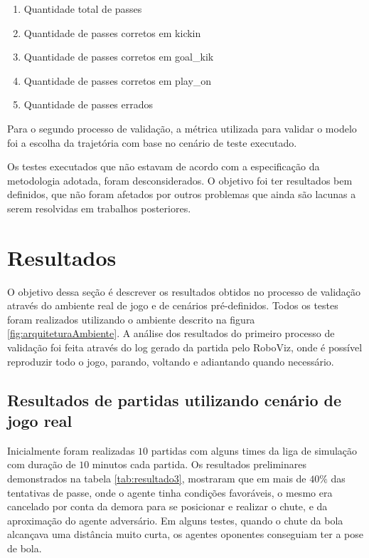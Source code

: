 \begin{enumerate}
    \item Quantidade total de passes
    \item Quantidade de passes corretos em kickin
    \item Quantidade de passes corretos em goal\_kik
    \item Quantidade de passes corretos em play\_on
    \item Quantidade de passes errados
\end{enumerate}

Para o segundo processo de validação, a métrica utilizada para validar o modelo foi a escolha da trajetória com base no 
cenário de teste executado.

Os testes executados que não estavam de acordo com a especificação da metodologia adotada, foram desconsiderados. O objetivo foi 
ter resultados bem definidos, que não foram afetados por outros problemas que ainda são lacunas a serem resolvidas em 
trabalhos posteriores.

\section{Resultados} 
\label{resultados}
O objetivo dessa seção é descrever os resultados obtidos no processo de validação através do ambiente real de jogo e de cenários 
pré-definidos. Todos os testes foram realizados utilizando o ambiente descrito na figura \ref{fig:arquiteturaAmbiente}. A análise 
dos resultados do primeiro processo de validação foi feita através do log gerado da partida pelo RoboViz, onde é possível reproduzir
todo o jogo, parando, voltando e adiantando quando necessário.

\subsection{Resultados de partidas utilizando cenário de jogo real}

Inicialmente foram realizadas $10$ partidas com alguns times da liga de simulação com duração de $10$ minutos cada partida. Os 
resultados preliminares demonstrados na tabela \ref{tab:resultado3}, mostraram que em mais de $40\%$ das tentativas de passe, 
onde o agente tinha condições favoráveis, o mesmo era cancelado por conta da demora para se posicionar e realizar o chute, e da
aproximação do agente adversário. Em alguns testes, quando o chute da bola alcançava uma dist\^ancia muito curta, os agentes 
oponentes conseguiam ter a pose de bola.

